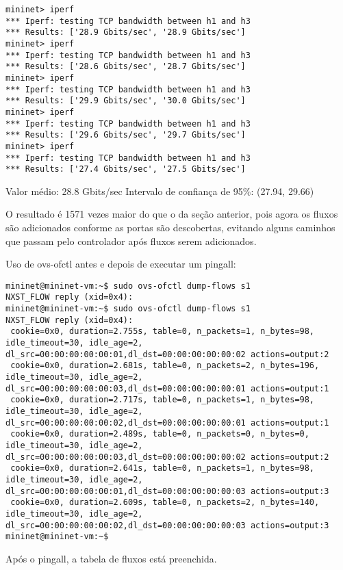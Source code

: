 \documentclass[12pt,letterpaper]{article}
\begin{document}
\begin{verbatim}
mininet> iperf 
*** Iperf: testing TCP bandwidth between h1 and h3 
*** Results: ['28.9 Gbits/sec', '28.9 Gbits/sec'] 
mininet> iperf 
*** Iperf: testing TCP bandwidth between h1 and h3 
*** Results: ['28.6 Gbits/sec', '28.7 Gbits/sec'] 
mininet> iperf 
*** Iperf: testing TCP bandwidth between h1 and h3 
*** Results: ['29.9 Gbits/sec', '30.0 Gbits/sec'] 
mininet> iperf 
*** Iperf: testing TCP bandwidth between h1 and h3 
*** Results: ['29.6 Gbits/sec', '29.7 Gbits/sec'] 
mininet> iperf 
*** Iperf: testing TCP bandwidth between h1 and h3 
*** Results: ['27.4 Gbits/sec', '27.5 Gbits/sec']
\end{verbatim}

Valor médio: 28.8 Gbits/sec
Intervalo de confiança de 95\%: (27.94, 29.66)

O resultado é 1571 vezes maior do que o da seção anterior, pois agora os fluxos são adicionados conforme
as portas são descobertas, evitando alguns caminhos que passam pelo controlador após fluxos serem adicionados.

Uso de ovs-ofctl antes e depois de executar um pingall:

\begin{verbatim}
mininet@mininet-vm:~$ sudo ovs-ofctl dump-flows s1
NXST_FLOW reply (xid=0x4):
mininet@mininet-vm:~$ sudo ovs-ofctl dump-flows s1
NXST_FLOW reply (xid=0x4):
 cookie=0x0, duration=2.755s, table=0, n_packets=1, n_bytes=98, idle_timeout=30, idle_age=2, dl_src=00:00:00:00:00:01,dl_dst=00:00:00:00:00:02 actions=output:2
 cookie=0x0, duration=2.681s, table=0, n_packets=2, n_bytes=196, idle_timeout=30, idle_age=2, dl_src=00:00:00:00:00:03,dl_dst=00:00:00:00:00:01 actions=output:1
 cookie=0x0, duration=2.717s, table=0, n_packets=1, n_bytes=98, idle_timeout=30, idle_age=2, dl_src=00:00:00:00:00:02,dl_dst=00:00:00:00:00:01 actions=output:1
 cookie=0x0, duration=2.489s, table=0, n_packets=0, n_bytes=0, idle_timeout=30, idle_age=2, dl_src=00:00:00:00:00:03,dl_dst=00:00:00:00:00:02 actions=output:2
 cookie=0x0, duration=2.641s, table=0, n_packets=1, n_bytes=98, idle_timeout=30, idle_age=2, dl_src=00:00:00:00:00:01,dl_dst=00:00:00:00:00:03 actions=output:3
 cookie=0x0, duration=2.609s, table=0, n_packets=2, n_bytes=140, idle_timeout=30, idle_age=2, dl_src=00:00:00:00:00:02,dl_dst=00:00:00:00:00:03 actions=output:3
mininet@mininet-vm:~$ 
\end{verbatim}

Após o pingall, a tabela de fluxos está preenchida.
\end{document}
